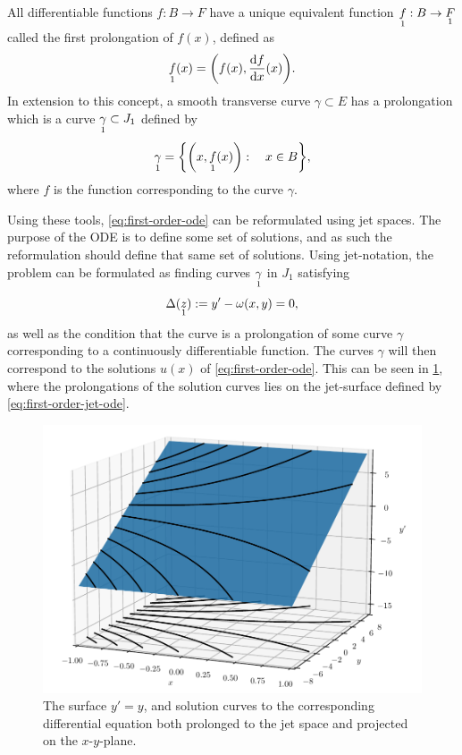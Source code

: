 All differentiable functions \(f: B \to F\) have a unique equivalent function \(\prolong{f}{1}: B \to \prolong{F}{1}\) called the first prolongation of \(f(x)\), defined as
\begin{equation*}
  \prolong{f}{1}(x) = \left(f(x), \diff{f}{x}(x)\right).
\end{equation*}
In extension to this concept, a smooth transverse curve \(\gamma \subset E\) has a prolongation which is a curve \(\prolong{\gamma}{1} \subset J_1\) defined by
\begin{equation*}
  \prolong{\gamma}{1} = \left\{\left(x, \prolong{f}{1}(x)\right):\quad x \in B\right\},
\end{equation*}
where \(f\) is the function corresponding to the curve \(\gamma\).

Using these tools, \cref{eq:first-order-ode} can be reformulated using jet spaces.
The purpose of the ODE is to define some set of solutions, and as such the reformulation should define that same set of solutions.
Using jet-notation, the problem can be formulated as finding curves \(\prolong{\gamma}{1}\) in \(J_1\) satisfying
\begin{equation} \label{eq:first-order-jet-ode}
  \Delta(\prolong{z}{1}) := y' - \omega(x,y) = 0,
\end{equation}
as well as the condition that the curve is a prolongation of some curve \(\gamma\) corresponding to a continuously differentiable function.
The curves \(\gamma\) will then correspond to the solutions \(u(x)\) of \cref{eq:first-order-ode}.
This can be seen in \cref{fig:jet-surface}, where the prolongations of the solution curves lies on the jet-surface defined by \cref{eq:first-order-jet-ode}.
\begin{figure}
  \centering
  \includegraphics[width=.75\textwidth]{images/jet-surface}
  \caption{The surface \(y' = y\), and solution curves to the corresponding differential equation both prolonged to the jet space and projected on the \(x\)-\(y\)-plane.}
  \label{fig:jet-surface}
\end{figure}

